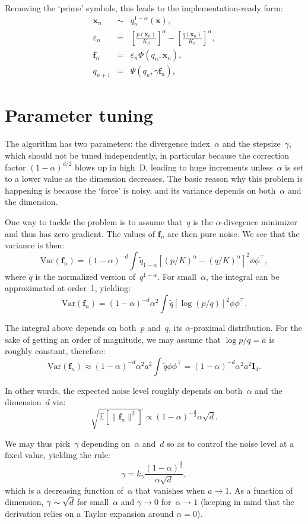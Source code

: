 \documentclass{article}
\def\x{\mathbf{x}}
\def\f{\mathbf{f}}
\def\E{\mathbb{E}}
\begin{document}
Removing the `prime' symbols, this leads to the implementation-ready form:
\begin{eqnarray*}
\x_n & \sim & q_n^{1-\alpha}(\x),\\
\varepsilon_n & = & 
\left[\frac{p(\x_n)}{K_n}\right]^\alpha
-\left[\frac{q(\x_n)}{K_n}\right]^\alpha,\\
\f_n & = & \varepsilon_n \Phi(q_n, \x_n),\\
q_{n+1} & = & \Psi(q_n, \gamma \f_n),
\end{eqnarray*}



\section{Parameter tuning}

The algorithm has two parameters: the divergence index~$\alpha$ and the stepsize~$\gamma$, which should not be tuned independently, in particular because the correction factor $(1-\alpha)^{d/2}$ blows up in high~D, leading to huge increments unless~$\alpha$ is set to a lower value as the dimension decreases. The basic reason why this problem is happening is because the `force' is noisy, and its variance depends on both~$\alpha$ and the dimension. 

One way to tackle the problem is to assume that~$q$ is the $\alpha$-divegence minimizer and thus has zero gradient. The values of $\f_n$ are then pure noise. We see that the variance is then:
$$
\text{Var}(\f_n) = (1-\alpha)^{-d} 
\int \tilde{q}_{1-\alpha} 
\left[(p/K)^\alpha - (q/K)^\alpha\right]^2\phi\phi^\top,
$$
where $\tilde{q}$ is the normalized version of~$q^{1-\alpha}$. For small~$\alpha$, the integral can be approximated at order~1, yielding:
$$
\text{Var}(\f_n) = (1-\alpha)^{-d} \alpha^2
\int \tilde{q} [\log(p/q)]^2 \phi\phi^\top . 
$$

The integral above depends on both~$p$ and~$q$, its $\alpha$-proximal distribution. For the sake of getting an order of magnitude, we may assume that $\log p/q=a$ is roughly constant, therefore: 
$$
\text{Var}(\f_n) \approx 
(1-\alpha)^{-d} \alpha^2
a^2 \int \tilde{q} \phi\phi^\top
= (1-\alpha)^{-d} \alpha^2
a^2 \mathbf{I}_d.
$$

In other words, the expected noise level roughly depends on both~$\alpha$ and the dimension~$d$ via: 
$$
\sqrt{\E[\|\f_n\|^2]} \propto (1-\alpha)^{-\frac{d}{2}} \alpha \sqrt{d} .
$$

We may thus pick~$\gamma$ depending on~$\alpha$ and~$d$ so as to control the noise level at a fixed value, yielding the rule:
$$
\gamma = k_\gamma \frac{(1-\alpha)^\frac{d}{2}}{\alpha\sqrt{d}},
$$
which is a decreasing function of~$\alpha$ that vanishes when $a\to 1$. As a function of dimension, $\gamma\sim \/\sqrt{d}$ for small~$\alpha$ and $\gamma\to 0$ for~$\alpha\to 1$ (keeping in mind that the derivation relies on a Taylor expansion around $\alpha=0$).
\end{document}
